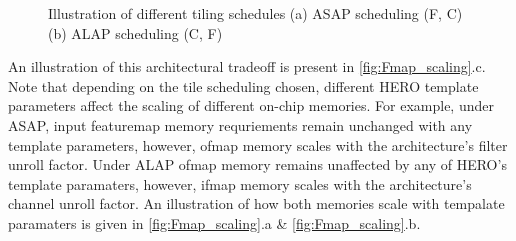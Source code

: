 \begin{figure}
    \centering
    \hspace{0.1cm} 
    \caption{Illustration of different tiling schedules (a) ASAP scheduling (F, C)  (b) ALAP scheduling (C, F)}
    \label{fig:tile_scheduling}
\end{figure}

An illustration of this architectural tradeoff is present
in \autoref{fig:Fmap_scaling}.c. Note that depending on the tile scheduling
chosen, different HERO template parameters affect the scaling of different
on-chip memories. For example, under ASAP, input featuremap memory requriements
remain unchanged with any template parameters, however, ofmap memory scales
with the architecture's filter unroll factor. Under ALAP ofmap memory remains
unaffected by any of HERO's template paramaters, however, ifmap memory scales
with the architecture's channel unroll factor. An illustration of how both
memories scale with tempalate paramaters is given in
\autoref{fig:Fmap_scaling}.a \& \autoref{fig:Fmap_scaling}.b. 

